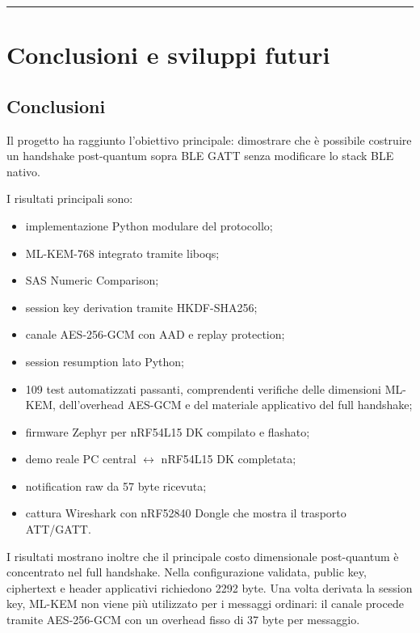 \documentclass[11pt,a4paper]{article}
\providecommand{\tightlist}{\setlength{\itemsep}{0pt}\setlength{\parskip}{0pt}}
\begin{document}
\begin{center}\rule{0.5\linewidth}{0.5pt}\end{center}

\section{Conclusioni e sviluppi futuri}\label{capitolo-8---conclusioni-e-sviluppi-futuri}

\subsection{Conclusioni}\label{conclusioni}

Il progetto ha raggiunto l'obiettivo principale: dimostrare che è
possibile costruire un handshake post-quantum sopra BLE GATT senza
modificare lo stack BLE nativo.

I risultati principali sono:

\begin{itemize}
\tightlist
\item implementazione Python modulare del protocollo;
\item ML-KEM-768 integrato tramite liboqs;
\item SAS Numeric Comparison;
\item session key derivation tramite HKDF-SHA256;
\item canale AES-256-GCM con AAD e replay protection;
\item session resumption lato Python;
\item 109 test automatizzati passanti, comprendenti verifiche delle dimensioni ML-KEM, dell'overhead AES-GCM e del materiale applicativo del full handshake;
\item firmware Zephyr per nRF54L15 DK compilato e flashato;
\item demo reale PC central $\leftrightarrow$ nRF54L15 DK completata;
\item notification raw da 57 byte ricevuta;
\item cattura Wireshark con nRF52840 Dongle che mostra il trasporto ATT/GATT.
\end{itemize}

I risultati mostrano inoltre che il principale costo dimensionale
post-quantum è concentrato nel full handshake. Nella configurazione
validata, public key, ciphertext e header applicativi richiedono
2292 byte. Una volta derivata la session key, ML-KEM non viene più
utilizzato per i messaggi ordinari: il canale procede tramite
AES-256-GCM con un overhead fisso di 37 byte per messaggio.
\end{document}
